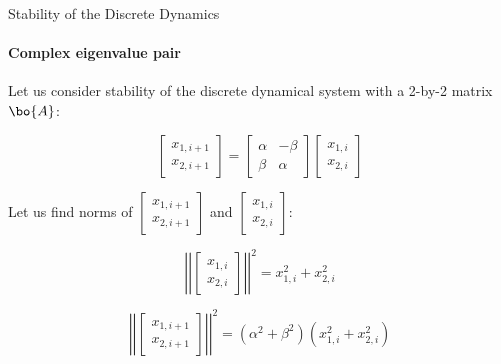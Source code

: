 \documentclass{beamer}
\begin{document}
\begin{frame}{Stability of the Discrete Dynamics}
	\framesubtitle{Complex eigenvalue pair}
	\begin{flushleft}
		
		Let us consider stability of the discrete dynamical system with a 2-by-2 matrix $\bo{A}$:
		
		\begin{equation}
			\begin{bmatrix}
				x_{1, i+1} \\ x_{2, i+1}
			\end{bmatrix}
			= 
			\begin{bmatrix}
				\alpha & -\beta \\ \beta & \alpha
			\end{bmatrix}     
			\begin{bmatrix}
				x_{1, i} \\ x_{2, i}
			\end{bmatrix}
		\end{equation}	
		
		Let us find norms of $\begin{bmatrix}
			x_{1, i+1} \\ x_{2, i+1}
		\end{bmatrix}$ and $\begin{bmatrix}
		x_{1, i} \\ x_{2, i}
	\end{bmatrix}$:


		\begin{equation}
		\left | \left|
		\begin{bmatrix}
			x_{1, i} \\ x_{2, i}
		\end{bmatrix}
		\right | \right|^2
			= 
	 	x_{1, i}^2 + x_{2, i}^2
		\end{equation}

		\begin{equation}
			\left | \left|
			\begin{bmatrix}
				x_{1, i+1} \\ x_{2, i+1}
			\end{bmatrix}
			\right | \right|^2
			= 
			(\alpha^2 + \beta^2) (x_{1, i}^2 + x_{2, i}^2)
		\end{equation}
		
		
	\end{flushleft}
\end{frame}
\end{document}
